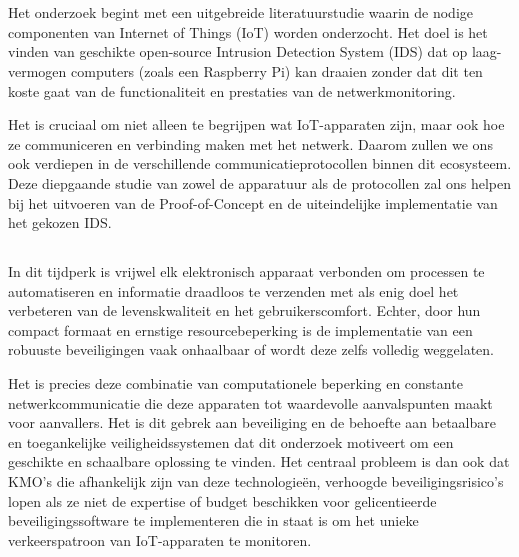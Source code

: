
\chapter{}%
\label{ch:inleiding}

Het onderzoek begint met een uitgebreide literatuurstudie waarin de nodige componenten van Internet of Things (IoT) worden onderzocht. Het doel is het vinden van geschikte open-source Intrusion Detection System (IDS) dat op laag-vermogen computers (zoals een Raspberry Pi) kan draaien zonder dat dit ten koste gaat van de functionaliteit en prestaties van de netwerkmonitoring.
\vspace{0.7em}

Het is cruciaal om niet alleen te begrijpen wat IoT-apparaten zijn, maar ook hoe ze communiceren en verbinding maken met het netwerk. Daarom zullen we ons ook verdiepen in de verschillende communicatieprotocollen binnen dit ecosysteem. Deze diepgaande studie van zowel de apparatuur als de protocollen zal ons helpen bij het uitvoeren van de Proof-of-Concept en de uiteindelijke implementatie van het gekozen IDS.



\section{}%
\label{sec:probleemstelling}


In dit tijdperk is vrijwel elk elektronisch apparaat verbonden om processen te automatiseren en informatie draadloos te verzenden met als enig doel het verbeteren van de levenskwaliteit en het gebruikerscomfort. Echter, door hun compact formaat en ernstige resourcebeperking is de implementatie van een robuuste beveiligingen vaak onhaalbaar of wordt deze zelfs volledig weggelaten.
\vspace{0.7em}

Het is precies deze combinatie van computationele beperking en constante netwerkcommunicatie die deze apparaten tot waardevolle aanvalspunten maakt voor aanvallers. Het is dit gebrek aan beveiliging en de behoefte aan betaalbare en toegankelijke veiligheidssystemen dat dit onderzoek motiveert om een geschikte en schaalbare oplossing te vinden. Het centraal probleem is dan ook dat KMO’s die afhankelijk zijn van deze technologieën, verhoogde beveiligingsrisico’s lopen als ze niet de expertise of budget beschikken voor gelicentieerde beveiligingssoftware te implementeren die in staat is om het unieke verkeerspatroon van IoT-apparaten te monitoren.


